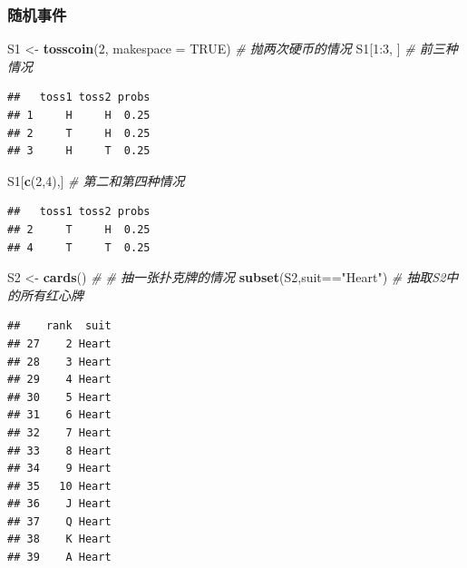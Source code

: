 \documentclass[]{article}
\newenvironment{Shaded}{\begin{snugshade}}{\end{snugshade}}
\newcommand{\KeywordTok}[1]{\textcolor[rgb]{0.13,0.29,0.53}{\textbf{{#1}}}}
\newcommand{\DataTypeTok}[1]{\textcolor[rgb]{0.13,0.29,0.53}{{#1}}}
\newcommand{\DecValTok}[1]{\textcolor[rgb]{0.00,0.00,0.81}{{#1}}}
\newcommand{\StringTok}[1]{\textcolor[rgb]{0.31,0.60,0.02}{{#1}}}
\newcommand{\CommentTok}[1]{\textcolor[rgb]{0.56,0.35,0.01}{\textit{{#1}}}}
\newcommand{\OtherTok}[1]{\textcolor[rgb]{0.56,0.35,0.01}{{#1}}}
\newcommand{\NormalTok}[1]{{#1}}
\begin{document}
\subsubsection{随机事件}

\begin{Shaded}
\begin{Highlighting}[]
\NormalTok{S1 <-}\StringTok{ }\KeywordTok{tosscoin}\NormalTok{(}\DecValTok{2}\NormalTok{, }\DataTypeTok{makespace =} \OtherTok{TRUE}\NormalTok{) }\CommentTok{# 抛两次硬币的情况}
\NormalTok{S1[}\DecValTok{1}\NormalTok{:}\DecValTok{3}\NormalTok{, ] }\CommentTok{# 前三种情况}
\end{Highlighting}
\end{Shaded}

\begin{verbatim}
##   toss1 toss2 probs
## 1     H     H  0.25
## 2     T     H  0.25
## 3     H     T  0.25
\end{verbatim}

\begin{Shaded}
\begin{Highlighting}[]
\NormalTok{S1[}\KeywordTok{c}\NormalTok{(}\DecValTok{2}\NormalTok{,}\DecValTok{4}\NormalTok{),] }\CommentTok{# 第二和第四种情况}
\end{Highlighting}
\end{Shaded}

\begin{verbatim}
##   toss1 toss2 probs
## 2     T     H  0.25
## 4     T     T  0.25
\end{verbatim}

\begin{Shaded}
\begin{Highlighting}[]
\NormalTok{S2 <-}\StringTok{ }\KeywordTok{cards}\NormalTok{() }\CommentTok{# # 抽一张扑克牌的情况}
\KeywordTok{subset}\NormalTok{(S2,suit==}\StringTok{"Heart"}\NormalTok{) }\CommentTok{# 抽取S2中的所有红心牌}
\end{Highlighting}
\end{Shaded}

\begin{verbatim}
##    rank  suit
## 27    2 Heart
## 28    3 Heart
## 29    4 Heart
## 30    5 Heart
## 31    6 Heart
## 32    7 Heart
## 33    8 Heart
## 34    9 Heart
## 35   10 Heart
## 36    J Heart
## 37    Q Heart
## 38    K Heart
## 39    A Heart
\end{verbatim}

\begin{Shaded}
\end{Shaded}
\end{document}
